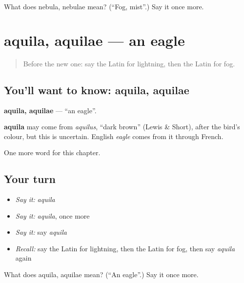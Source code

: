 \begin{tcolorbox}[breakable,colback=teal!4,colframe=teal!35!black,title={Before you move on}]
What does nebula, nebulae mean? (\textquotedblleft{}Fog, mist\textquotedblright{}.) Say it once more.
\end{tcolorbox}
\section[aquila, aquilae]{aquila, aquilae — an eagle}

\label{lesson:LA-C131-aquila}



\begin{quote}
Before the new one: say the Latin for lightning, then the Latin for fog.
\end{quote}

\subsection*{You'll want to know: aquila, aquilae}
\textbf{aquila, aquilae} — \textquotedblleft{}an eagle\textquotedblright{}.

\begin{cousinweb}
\textbf{aquila} may come from \emph{aquilus}, \textquotedblleft{}dark brown\textquotedblright{} (Lewis \& Short), after the bird's colour, but this is uncertain. English \emph{eagle} comes from it through French.
\end{cousinweb}

\begin{grammarlens}[title={What you've built}]
One more word for this chapter.
\end{grammarlens}

\subsection*{Your turn}
\begin{itemize}
\raggedright
  \item \emph{Say it:} \emph{aquila}
  \item \emph{Say it:} \emph{aquila}, once more
  \item \emph{Say it:} say \emph{aquila}
  \item \emph{Recall:} say the Latin for lightning, then the Latin for fog, then say \emph{aquila} again
\end{itemize}

\begin{tcolorbox}[breakable,colback=teal!4,colframe=teal!35!black,title={Before you move on}]
What does aquila, aquilae mean? (\textquotedblleft{}An eagle\textquotedblright{}.) Say it once more.
\end{tcolorbox}
